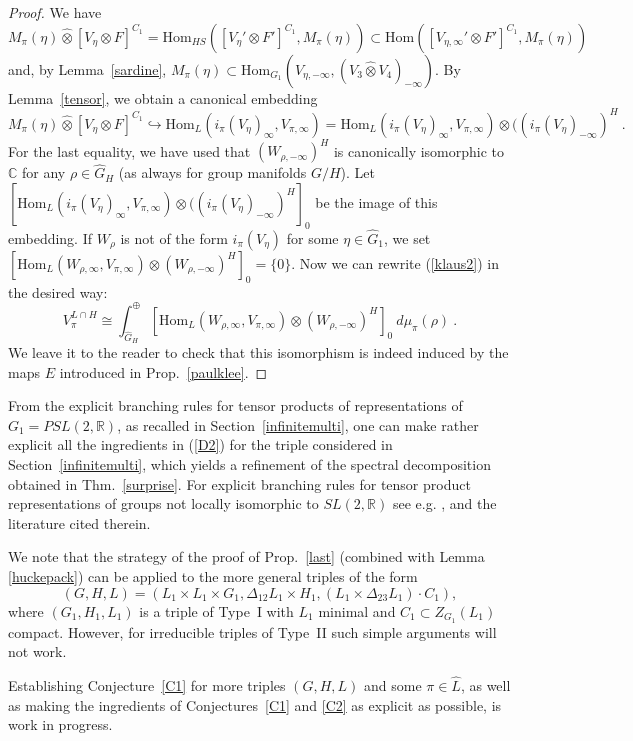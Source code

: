 \documentclass[10]{amsart}
\theoremstyle{remark}
\theoremstyle{definition}
\numberwithin{equation}{section}
\newcommand{\R}{\mathbb{R}}           %
\newcommand{\C}{\mathbb{C}}           %
\newcommand{\Hom}{\mathrm{Hom}}
\begin{document}
{\begin{proof}
We have $M_\pi(\eta)\hat\otimes [V_\eta\otimes F]^{C_1}=\Hom_{HS}( [V_\eta'\otimes F']^{C_1}, M_\pi(\eta))\subset \Hom( [V_{\eta,\infty}'\otimes F']^{C_1}, M_\pi(\eta))$
and, by Lemma~\ref{sardine}, $M_\pi(\eta)\subset  \Hom_{G_1}(V_{\eta,-\infty}, (V_3\hat \otimes V_4)_{-\infty})$. By Lemma~\ref{tensor}, we obtain a canonical
embedding 
$$    M_\pi(\eta)\hat\otimes [V_\eta\otimes F]^{C_1}\hookrightarrow \Hom_L (i_\pi(V_\eta)_\infty, V_{\pi,\infty})=\Hom_L (i_\pi(V_\eta)_\infty, V_{\pi,\infty})\otimes ((i_\pi(V_\eta)_{-\infty})^H \ .$$
For the last equality, we have used that $(W_{\rho,-\infty})^H$ is canonically isomorphic to $\C$ for any $\rho\in\widehat G_H$ (as always for group manifolds $G/H$).
Let $\left [\Hom_L (i_\pi(V_\eta)_\infty, V_{\pi,\infty})\otimes ((i_\pi(V_\eta)_{-\infty})^H\right ]_0$ be the image of this embedding. If $W_\rho$ is not of the form $i_\pi(V_\eta)$ for some $\eta\in \widehat G_1$, we set 
$\left [\Hom_L(W_{\rho,\infty},V_{\pi,\infty})\otimes (W_{\rho,-\infty})^H\right ]_0=\{0\}$. Now we can rewrite (\ref{klaus2}) in the desired way:
$$   V_\pi^{L\cap H} \cong \int^\oplus_{\widehat G_H}\left [\Hom_L(W_{\rho,\infty},V_{\pi,\infty})\otimes (W_{\rho,-\infty})^H\right ]_0\:d\mu_\pi(\rho)\ .$$
We leave it to the reader to check that this isomorphism is indeed induced by the maps $E$ introduced in Prop.~\ref{paulklee}.
\end{proof}

From the explicit branching rules for tensor products of representations of $G_1=PSL(2,\R)$, as recalled in Section~\ref{infinitemulti}, one can make rather explicit
all the ingredients in (\ref{D2}) for the triple considered in Section~\ref{infinitemulti}, which yields a refinement of the spectral decomposition obtained in Thm.~\ref{surprise}.
For explicit branching rules for tensor product representations of groups not locally isomorphic to $SL(2,\R)$ see e.g. \cite{Martin75}, \cite{Spyros25} and the literature cited therein. 

We note that the strategy of the proof
of Prop.~\ref{last} (combined with Lemma \ref{huckepack}) can be applied to the more general triples of the form 
$$(G,H,L)=(L_1\times L_1\times G_1, \Delta_{12}L_1\times H_1, (L_1\times \Delta_{23} L_1)\cdot C_1), $$
where $(G_1,H_1,L_1)$ is
a triple of Type~I with $L_1$ minimal and $C_1\subset Z_{G_1}(L_1)$ compact. However, for  irreducible triples of Type~II such simple arguments will not work. 

Establishing Conjecture~\ref{C1} 
for more triples $(G,H,L)$ and some $\pi\in\widehat L$, as well as making the ingredients of Conjectures~\ref{C1} and \ref{C2} as explicit as possible, is work in progress. 

}
\end{document}
